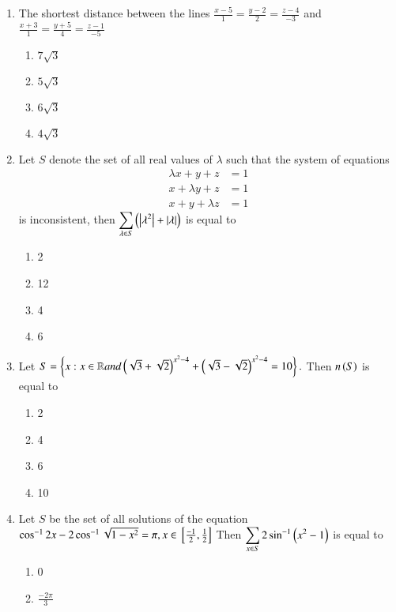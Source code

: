 \documentclass[journal]{IEEEtran}
\begin{document}
\begin{enumerate}
\begin{enumerate}
\end{enumerate}
\item The shortest distance between the lines $\frac{x-5}{1}=\frac{y-2}{2}=\frac{z-4}{-3}$ and $\frac{x+3}{1}=\frac{y+5}{4}=\frac{z-1}{-5}$
\begin{multicols}{2}
\begin{enumerate}
\item $7\sqrt{3}$
\item $5\sqrt{3}$
\item $6\sqrt{3}$
\item $4\sqrt{3}$
\end{enumerate}
\end{multicols}
\item Let $S$ denote the set of all real values of $\lambda$ such that the system of equations
\begin{align*}
    \lambda x+y+z&=1\\
    x+\lambda y+z&=1\\
    x+y+\lambda z&=1
\end{align*}
is inconsistent, then $\displaystyle \sum_{\lambda \in S}\left(\left\vert\lambda^2\right\vert + \left\vert\lambda\right\vert\right)$ is equal to 
\begin{enumerate}
\item 2
\item 12
\item 4
\item 6
\end{enumerate}
\item Let $S=\left\{ x:x \in \mathbb{R}  and  \left(\sqrt{3}+\sqrt{2}\right)^{x^2-4}+\left( \sqrt{3}-\sqrt{2}\right)^{x^2-4}=10\right\}.$ Then $n\left(S\right)$ is equal to 
\begin{multicols}{2}
\begin{enumerate}
\item 2
\item 4
\item 6
\item 10
\end{enumerate}
\end{multicols}
\item Let $S$ be the set of all solutions of the equation $\cos^{-1}{2x} -2 \cos^{-1}{\sqrt{1-x^2}}=\pi,  x \in {}\left[\frac{-1}{2},\frac{1}{2}\right] $ Then $\displaystyle \sum_{x\in S} 2 \sin^{-1}\left(x^2-1\right)$ is equal to
\begin{multicols}{2}
\begin{enumerate}
\item 0
\item $\frac{-2\pi}{3}$

\end{enumerate}
\end{multicols}
\end{enumerate}
\end{document}
